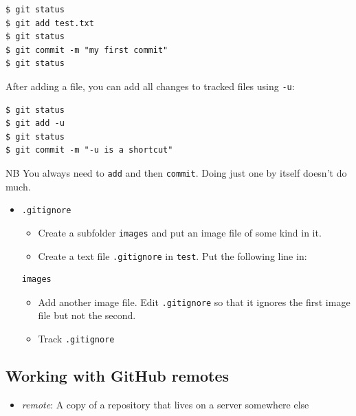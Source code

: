 \documentclass[
]{article}
\providecommand{\tightlist}{%
  \setlength{\itemsep}{0pt}\setlength{\parskip}{0pt}}
\begin{document}
\begin{verbatim}
$ git status
$ git add test.txt
$ git status
$ git commit -m "my first commit"
$ git status
\end{verbatim}

After adding a file, you can add all changes to tracked files using \texttt{-u}:

\begin{verbatim}
$ git status
$ git add -u
$ git status
$ git commit -m "-u is a shortcut"
\end{verbatim}

NB You always need to \texttt{add} and then \texttt{commit}. Doing just one by itself doesn't do much.

\begin{itemize}
\tightlist
\item
  \texttt{.gitignore}

  \begin{itemize}
  \tightlist
  \item
    Create a subfolder \texttt{images} and put an image file of some kind in it.
  \item
    Create a text file \texttt{.gitignore} in \texttt{test}. Put the following line in:
  \end{itemize}

\begin{verbatim}
images
\end{verbatim}

  \begin{itemize}
  \tightlist
  \item
    Add another image file. Edit \texttt{.gitignore} so that it ignores the first image file but not the second.\\
  \item
    Track \texttt{.gitignore}
  \end{itemize}
\end{itemize}

\hypertarget{working-with-github-remotes}{%
\subsection{Working with GitHub remotes}\label{working-with-github-remotes}}

\begin{itemize}
\tightlist
\item
  \emph{remote}: A copy of a repository that lives on a server somewhere else
\end{itemize}
\end{document}

